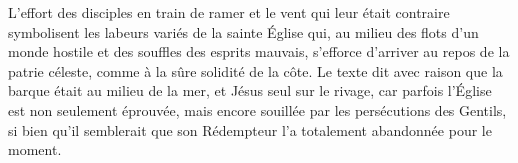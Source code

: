 L’effort des disciples en train de ramer et le vent qui leur était contraire
	symbolisent les labeurs variés de la sainte Église
	qui, au milieu des flots d’un monde hostile
		et des souffles des esprits mauvais,
	s’efforce d’arriver au repos de la patrie céleste,
	comme à la sûre solidité de la côte.
Le texte dit avec raison que la barque était au milieu de la mer,
	et Jésus seul sur le rivage,
	car parfois l’Église est non seulement éprouvée,
	mais encore souillée par les persécutions des Gentils,
	si bien qu’il semblerait que son Rédempteur
		l’a totalement abandonnée pour le moment.
